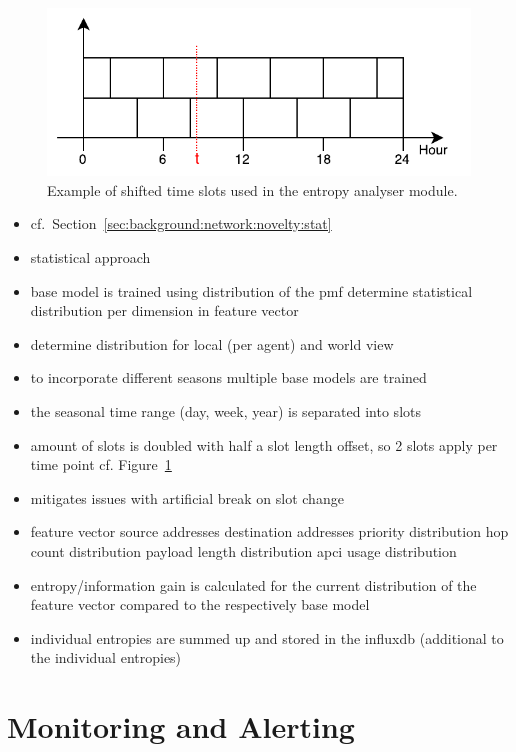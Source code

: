 \begin{figure}[h]
	\centering
	\includegraphics[]{figures/300-time-slots.pdf}
	\caption{Example of shifted time slots used in the entropy analyser module.}
	\label{fig:concept:time-slots}
\end{figure}

\begin{itemize}
	\item cf.~Section~\ref{sec:background:network:novelty:stat}
	\item statistical approach
	\item base model is trained using distribution of the \gls{pmf}
		\subitem determine statistical distribution per dimension in feature vector
	\item determine distribution for local (per agent) and world view
	\item to incorporate different seasons multiple base models are trained 
	\item the seasonal time range (day, week, year) is separated into slots
	\item amount of slots is doubled with half a slot length offset, so 2 slots apply per time point cf. Figure~\ref{fig:concept:time-slots}
	\item mitigates issues with artificial break on slot change
	\item feature vector
		\subitem source addresses
		\subitem destination addresses
		\subitem priority distribution
		\subitem hop count distribution
		\subitem payload length distribution
		\subitem \gls{apci} usage distribution
	\item entropy/information gain is calculated for the current distribution of the feature vector compared to the respectively base model
	\item individual entropies are summed up and stored in the \gls{influxdb} (additional to the individual entropies)
\end{itemize}

\section{Monitoring and Alerting}
\label{sec:concept:mon}

